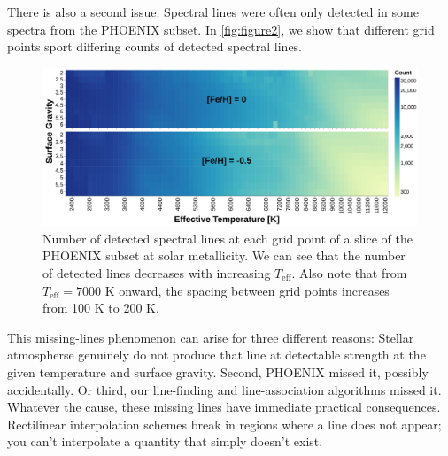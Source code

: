 \documentclass[twocolumn]{aastex631}
\begin{document}
There is also a second issue. Spectral lines were often only detected in some spectra from the PHOENIX subset. 
In \autoref{fig:figure2}, we show that different grid points sport differing counts of detected spectral lines.
\begin{figure}
    \centering
    \includegraphics[width=\textwidth]{figure2}
    \caption{Number of detected spectral lines at each grid point of 
    a slice of the PHOENIX subset at solar metallicity. We can see that
    the number of detected lines decreases with increasing $T_{\mathrm{eff}}$.
    Also note that from $T_{\mathrm{eff}} = 7000$ K onward, the spacing 
    between grid points increases from 100 K to 200 K.}
    \label{fig:figure2}
\end{figure}

This missing-lines phenomenon can arise for three different reasons: Stellar atmospherse genuinely do not produce that line at detectable strength at the given temperature and surface gravity. 
Second, PHOENIX missed it, possibly accidentally. 
Or third, our line-finding and line-association algorithms missed it. 
Whatever the cause, these missing lines have immediate practical consequences. 
Rectilinear interpolation schemes break in regions where a line does not appear; you can't interpolate a quantity that simply doesn't exist.
\end{document}
